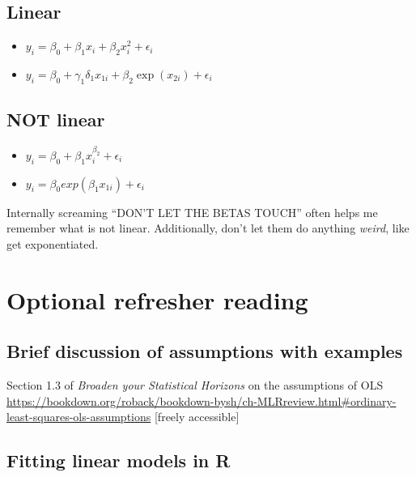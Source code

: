 \documentclass[
]{book}
\providecommand{\tightlist}{%
  \setlength{\itemsep}{0pt}\setlength{\parskip}{0pt}}
\begin{document}
\hypertarget{linear}{%
\subsection{Linear}\label{linear}}

\begin{itemize}
\tightlist
\item
  \(y_i = \beta_0 + \beta_1x_i + \beta_2x_i^2 + \epsilon_i\)\\
\item
  \(y_i = \beta_0 + γ_1δ_1x_{1i} + \beta_2\exp(x_{2i}) + \epsilon_i\)
\end{itemize}

\hypertarget{not-linear}{%
\subsection{NOT linear}\label{not-linear}}

\begin{itemize}
\tightlist
\item
  \(y_i = \beta_0 + \beta_1x_i^{\beta_2} + \epsilon_i\)\\
\item
  \(y_i = \beta_0 exp(\beta_1x_{1i}) + \epsilon_i\)
\end{itemize}

Internally screaming ``DON'T LET THE BETAS TOUCH'' often helps me remember what is not linear. Additionally, don't let them do anything \emph{weird}, like get exponentiated.

\hypertarget{optional-refresher-reading}{%
\section{Optional refresher reading}\label{optional-refresher-reading}}

\hypertarget{brief-discussion-of-assumptions-with-examples}{%
\subsection{Brief discussion of assumptions with examples}\label{brief-discussion-of-assumptions-with-examples}}

Section 1.3 of \emph{Broaden your Statistical Horizons} on the assumptions of OLS
\url{https://bookdown.org/roback/bookdown-bysh/ch-MLRreview.html\#ordinary-least-squares-ols-assumptions}
{[}freely accessible{]}

\hypertarget{fitting-linear-models-in-r}{%
\subsection{Fitting linear models in R}\label{fitting-linear-models-in-r}}
\end{document}
